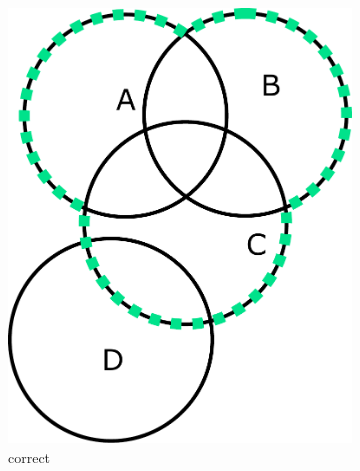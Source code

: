 \begin{figure}[htb]
	\centering
	\begin{subfigure}[b]{0.3\linewidth}
		\includegraphics[width=\textwidth]{figures/right_part.pdf}
		\caption{correct}
	\end{subfigure}
	~
	\begin{subfigure}[b]{0.3\linewidth}

\end{subfigure}
\end{figure}
